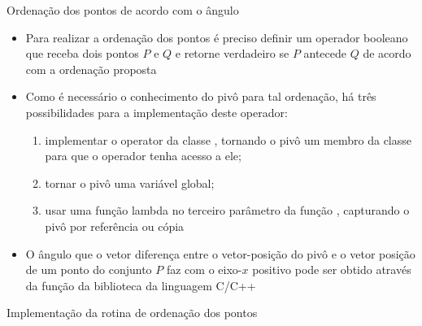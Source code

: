 \begin{frame}[fragile]{Ordenação dos pontos de acordo com o ângulo}

    \begin{itemize}
        \item Para realizar a ordenação dos pontos é preciso definir um operador booleano que
        receba dois pontos $P$ e $Q$ e retorne verdadeiro se $P$ antecede $Q$ de
        acordo com a ordenação proposta

        \item Como é necessário o conhecimento do pivô para tal ordenação, há três possibilidades 
            para a implementação deste operador:

        \begin{enumerate}
            \item implementar o operator  da classe , tornando o pivô um 
                membro da classe para que o operador tenha acesso a ele;
            \item tornar o pivô uma variável global;
            \item usar uma função lambda no terceiro parâmetro da função , 
                capturando o pivô por referência ou cópia
        \end{enumerate}

        \item O ângulo que o vetor diferença entre o vetor-posição do pivô e o vetor posição de um
            ponto do conjunto $P$ faz com o eixo-$x$ positivo pode ser obtido através da função
             da biblioteca  da linguagem C/C++

    \end{itemize}

\end{frame}



\begin{frame}[fragile]{Implementação da rotina de ordenação dos pontos}
\end{frame}

